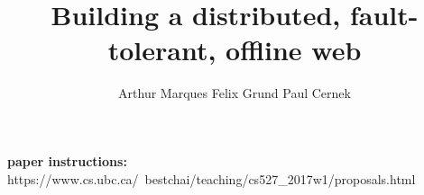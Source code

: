 \documentclass{article}
\title{Building a distributed, fault-tolerant, offline web}
\author{Arthur Marques \qquad Felix Grund \qquad Paul Cernek}
\begin{document}
\maketitle

\begin{abstract}

\end{abstract}

{\bf paper instructions:} https://www.cs.ubc.ca/~bestchai/teaching/cs527\_2017w1/proposals.html










\end{document}
